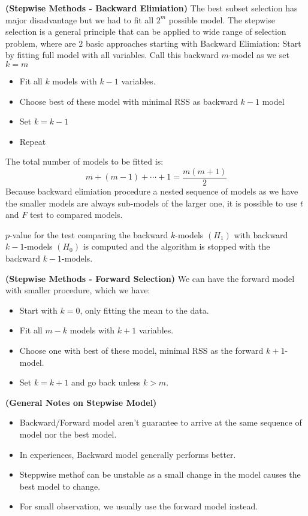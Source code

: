 \begin{remark}{\textbf{(Stepwise Methods - Backward Elimiation)}}
    The best subset selection has major disadvantage but we had to fit all $2^m$ possible model. The stepwise selection is a general principle that can be applied to wide range of selection problem, where are $2$ basic approaches starting with Backward Elimiation: Start by fitting full model with all variables. Call this backward $m$-model as we set $k=m$
    \begin{itemize}
        \item Fit all $k$ models with $k-1$ variables. 
        \item Choose best of these model with minimal RSS as backward $k-1$ model
        \item Set $k=k-1$
        \item Repeat 
    \end{itemize}
    The total number of models to be fitted is:
    \begin{equation*}
        m + (m-1) + \cdots + 1 = \frac{m(m+1)}{2}
    \end{equation*}
    Because backward elimiation procedure a nested sequence of models as we have the smaller models are always sub-models of the larger one, it is possible to use $t$ and $F$ test to compared models. 

    $p$-value for the test comparing the backward $k$-models $(H_1)$ with backward $k-1$-models $(H_0)$ is computed and the algorithm is stopped with the backward $k-1$-models.
\end{remark}

\begin{remark}{\textbf{(Stepwise Methods - Forward Selection)}}
    We can have the forward model with smaller procedure, which we have:
    \begin{itemize}
        \item Start with $k=0$, only fitting the mean to the data. 
        \item Fit all $m-k$ models with $k+1$ variables. 
        \item Choose one with best of these model, minimal RSS as the forward $k+1$-model. 
        \item Set $k=k+1$ and go back unless $k>m$. 
    \end{itemize}
\end{remark}

\begin{remark}{\textbf{(General Notes on Stepwise Model)}}
    \begin{itemize}
        \item Backward/Forward model aren't guarantee to arrive at the same sequence of model nor the best model. 
        \item In experiences, Backward model generally performs better. 
        \item Steppwise methof can be unstable as a small change in the model causes the best model to change. 
        \item For small observation, we usually use the forward model instead. 
    \end{itemize}
\end{remark}

